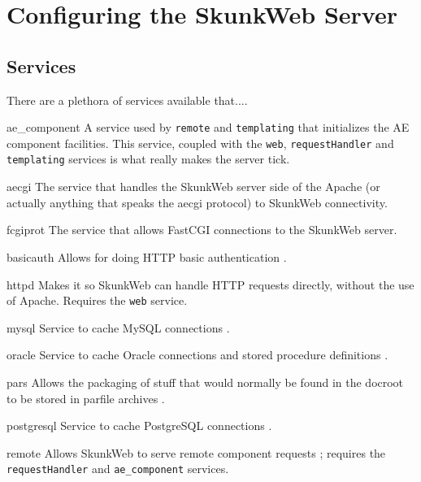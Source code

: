 \documentclass[titlepage]{manual}
\begin{document}
\chapter{Configuring the SkunkWeb Server}

\section{Services}
There are a plethora of services available that....
\begin{argdesc}
\item[ae_component] A service used by \texttt{remote} and \texttt{templating} that
initializes the AE component facilities.  This service, coupled with
the \texttt{web}, \texttt{requestHandler} and \texttt{templating}
services is what really makes the server tick.

\item[aecgi] The service that handles the SkunkWeb server side of the
Apache (or actually anything that speaks the aecgi protocol) to
SkunkWeb connectivity.

\item[fcgiprot] The service that allows FastCGI connections to the
SkunkWeb server.

\item[basicauth]  Allows for doing HTTP basic authentication .

\item[httpd] Makes it so SkunkWeb can handle HTTP requests directly,
without the use of Apache.  Requires the \texttt{web} service.

\item[mysql] Service to cache MySQL connections
.

\item[oracle] Service to cache Oracle connections and stored procedure
definitions .

\item[pars]  Allows the packaging of stuff that would normally be found in
the docroot to be stored in parfile archives .

\item[postgresql] Service to cache PostgreSQL connections
.

\item[remote] Allows SkunkWeb to serve remote component requests
; requires the \texttt{requestHandler} 
and \texttt{ae_component} services.


\end{argdesc}
\end{document}

